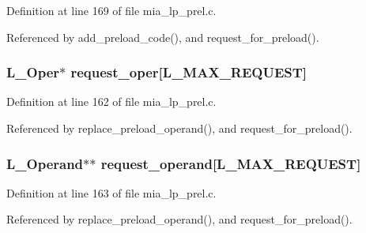 Definition at line 169 of file mia\_\-lp\_\-prel.c.

Referenced by add\_\-preload\_\-code(), and request\_\-for\_\-preload().
\subsubsection{\setlength{\rightskip}{0pt plus 5cm}L\_\-Oper$\ast$ \bf{request\_\-oper}[L\_\-MAX\_\-REQUEST]\hspace{0.3cm}{\tt  [static]}}\label{mia__lp__prel_8c_fe951214eacc34396c8347408cc0a0b7}




Definition at line 162 of file mia\_\-lp\_\-prel.c.

Referenced by replace\_\-preload\_\-operand(), and request\_\-for\_\-preload().
\subsubsection{\setlength{\rightskip}{0pt plus 5cm}L\_\-Operand$\ast$$\ast$ \bf{request\_\-operand}[L\_\-MAX\_\-REQUEST]\hspace{0.3cm}{\tt  [static]}}\label{mia__lp__prel_8c_1bf5a3c6253a59a59b7b109fece0821b}




Definition at line 163 of file mia\_\-lp\_\-prel.c.

Referenced by replace\_\-preload\_\-operand(), and request\_\-for\_\-preload().